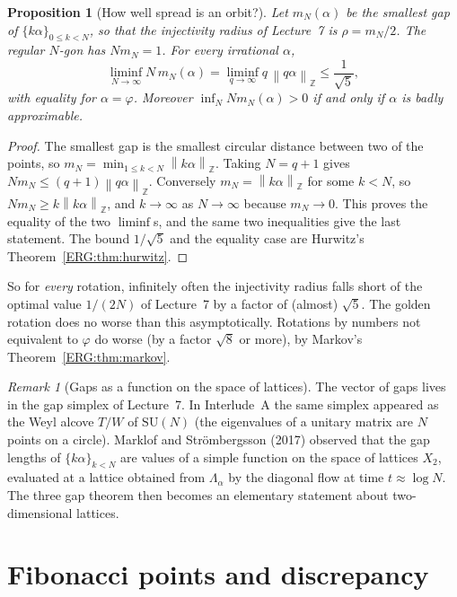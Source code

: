 \documentclass[11pt,openany]{book}
\theoremstyle{plain}
\newtheorem{proposition}[theorem]{Proposition}
\theoremstyle{definition}
\theoremstyle{remark}
\newtheorem{remark}[theorem]{Remark}
\newcommand{\Z}{\mathbb{Z}}
\newcommand{\Lat}{\Lambda}             %
\newcommand{\norm}[1]{\left\lVert #1 \right\rVert}
\begin{document}
\begin{proposition}[How well spread is an orbit?]\label{ERG:prop:spread}
Let $m_N(\alpha)$ be the smallest gap of $\{k\alpha\}_{0\le k<N}$, so that the injectivity radius of
Lecture~7 is $\rho=m_N/2$. The regular $N$-gon has $Nm_N=1$. For every irrational $\alpha$,
\[
  \liminf_{N\to\infty}N\,m_N(\alpha)=\liminf_{q\to\infty}q\,\norm{q\alpha}_\Z\le\frac1{\sqrt5},
\]
with equality for $\alpha=\varphi$. Moreover $\inf_NNm_N(\alpha)>0$ if and only if $\alpha$ is badly
approximable.
\end{proposition}

\begin{proof}
The smallest gap is the smallest circular distance between two of the points, so
$m_N=\min_{1\le k<N}\norm{k\alpha}_\Z$. Taking $N=q+1$ gives
$Nm_N\le(q+1)\norm{q\alpha}_\Z$. Conversely $m_N=\norm{k\alpha}_\Z$ for some $k<N$, so
$Nm_N\ge k\norm{k\alpha}_\Z$, and $k\to\infty$ as $N\to\infty$ because $m_N\to0$. This proves the
equality of the two $\liminf$s, and the same two inequalities give the last statement. The bound
$1/\sqrt5$ and the equality case are Hurwitz's Theorem~\ref{ERG:thm:hurwitz}.
\end{proof}

So for \emph{every} rotation, infinitely often the injectivity radius falls short of the optimal value
$1/(2N)$ of Lecture~7 by a factor of (almost) $\sqrt5$. The golden rotation does no worse than this
asymptotically. Rotations by numbers not equivalent to $\varphi$ do worse (by a factor $\sqrt8$ or
more), by Markov's Theorem~\ref{ERG:thm:markov}.

\begin{remark}[Gaps as a function on the space of lattices]
The vector of gaps lives in the gap simplex of Lecture~7. In Interlude~A the same simplex appeared as
the Weyl alcove $T/W$ of $\mathrm{SU}(N)$ (the eigenvalues of a unitary matrix are $N$ points on a
circle). Marklof and Str\"ombergsson (2017) observed that the gap lengths of $\{k\alpha\}_{k<N}$ are
values of a simple function on the space of lattices $X_2$, evaluated at a lattice obtained from
$\Lat_\alpha$ by the diagonal flow at time $t\approx\log N$. The three gap theorem then becomes an elementary
statement about two-dimensional lattices.
\end{remark}

\section{Fibonacci points and discrepancy}
\label{ERG:sec:fib}
\end{document}
